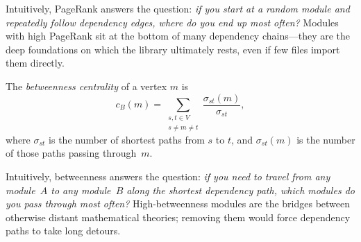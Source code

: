 Intuitively, PageRank answers the question: \emph{if you start at a random module and repeatedly follow dependency edges, where do you end up most often?} Modules with high PageRank sit at the bottom of many dependency chains---they are the deep foundations on which the library ultimately rests, even if few files import them directly.

\begin{definition}
The \emph{betweenness centrality} of a vertex $m$ is
\[
  c_B(m) = \sum_{\substack{s, t \in V \\ s \ne m \ne t}} \frac{\sigma_{st}(m)}{\sigma_{st}},
\]
where $\sigma_{st}$ is the number of shortest paths from $s$ to $t$, and $\sigma_{st}(m)$ is the number of those paths passing through~$m$.
\end{definition}

Intuitively, betweenness answers the question: \emph{if you need to travel from any module~$A$ to any module~$B$ along the shortest dependency path, which modules do you pass through most often?} High-betweenness modules are the bridges between otherwise distant mathematical theories; removing them would force dependency paths to take long detours.

